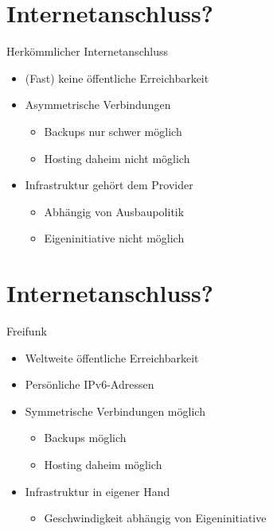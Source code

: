 \documentclass{beamer}
\begin{document}
\section{Internetanschluss?}
\begin{frame}{Herkömmlicher Internetanschluss}
  \begin{itemize}
    \item (Fast) keine öffentliche Erreichbarkeit
    \item Asymmetrische Verbindungen
    \begin{itemize}
      \item Backups nur schwer möglich
      \item Hosting daheim nicht möglich
    \end{itemize}
    \item Infrastruktur gehört dem Provider
    \begin{itemize}
      \item Abhängig von Ausbaupolitik
      \item Eigeninitiative nicht möglich
    \end{itemize}
  \end{itemize}
\end{frame}

\section{Internetanschluss?}

\begin{frame}{Freifunk}
  \begin{itemize}
    \item Weltweite öffentliche Erreichbarkeit
    \item Persönliche IPv6-Adressen
    \item Symmetrische Verbindungen möglich
    \begin{itemize}
      \item Backups möglich
      \item Hosting daheim möglich
    \end{itemize}
    \item Infrastruktur in eigener Hand
    \begin{itemize}
      \item Geschwindigkeit abhängig von Eigeninitiative
    \end{itemize}
  \end{itemize}

\end{frame}
\end{document}
